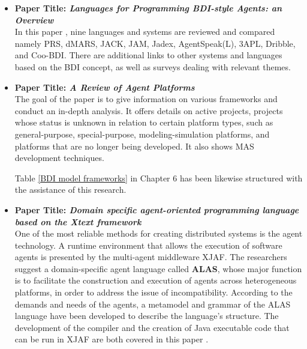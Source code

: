 \begin{itemize}[label={}]

\item \textbf{Paper Title: \textit{Languages for Programming \ac{BDI}-style Agents: an Overview}}\\

In this paper \cite{9lang}, nine languages and systems are reviewed and compared namely PRS, dMARS, JACK, JAM, Jadex, AgentSpeak(L), 3APL, Dribble, and Coo-\ac{BDI}. There are additional links to other systems and languages based on the \ac{BDI} concept, as well as surveys dealing with relevant themes.

\newpage

\item \textbf{Paper Title: \textit{A Review of Agent Platforms}}\\

The goal of the paper \cite{review} is to give information on various frameworks and conduct an in-depth analysis. It offers details on active projects, projects whose status is unknown in relation to certain platform types, such as general-purpose, special-purpose, modeling-simulation platforms, and platforms that are no longer being developed. It also shows \ac{MAS} development techniques.

\vspace{.5cm}

Table \ref{BDI model frameworks} in Chapter 6 has been likewise structured with the assistance of this research.

\vspace{.5cm}

\item \textbf{Paper Title: \textit{Domain specific agent-oriented programming language based on the Xtext framework}} \\

One of the most reliable methods for creating distributed systems is the agent technology. A runtime environment that allows the execution of software agents is presented by the multi-agent middleware XJAF. The researchers suggest a domain-specific agent language called \textbf{ALAS}, whose major function is to facilitate the construction and execution of agents across heterogeneous platforms, in order to address the issue of incompatibility. According to the demands and needs of the agents, a metamodel and grammar of the ALAS language have been developed to describe the language's structure. The development of the compiler and the creation of Java executable code that can be run in XJAF are both covered in this paper \cite{xtext}.


\end{itemize}
